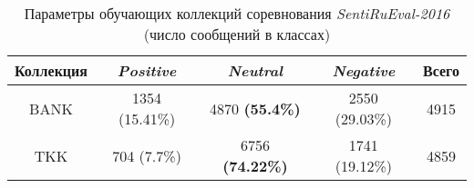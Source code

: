 \begin{table}[!ht]
\centering
\caption{Параметры обучающих коллекций соревнования {\it SentiRuEval-2016} (число сообщений в классах)}
\label{table:train2015balanced}
\begin{tabular}{|c|c|c|c|c|}
\hline
Коллекция & \textit{Positive} & \textit{Neutral}       & \textit{Negative} & Всего \\ \hline
BANK      & 1354 (15.41\%)    & 4870 {\bf (55.4\%)}    & 2550 (29.03\%)    & 4915  \\ \hline
TKK       & 704 (7.7\%)       & 6756 {\bf (74.22\%)}   & 1741 (19.12\%)    & 4859  \\ \hline
\end{tabular}
\end{table}
